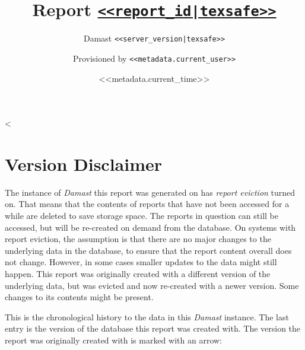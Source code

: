 \documentclass[fontsize=10pt,toc=chapterentrywithdots]{scrreprt}
\begin{document}
\title{Report \texttt{\href{<<report_url|texsafe>>}{<<report_id|texsafe>>}}}
\subtitle{Damast \texttt{<<server_version|texsafe>>}}
\date{<<metadata.current_time>>}
\author{Provisioned by \texttt{<<metadata.current_user>>}}
\publishers{Generated with Damast \\ \small{\url{https://github.com/UniStuttgart-VISUS/damast}}}

\maketitle

\pagestyle{scrheadings}
\cfoot*{}
\chead*{}
\ihead*{\textsc{\rightmark}}

\tableofcontents

<%
\clearpage
\chapter*{Version Disclaimer}
\label{chapter:version-disclaimer}

The instance of \emph{Damast} this report was generated on has \emph{report eviction} turned on.
That means that the contents of reports that have not been accessed for a while are deleted to save storage space.
The reports in question can still be accessed, but will be re-created on demand from the database.
On systems with report eviction, the assumption is that there are no major changes to the underlying data in the database, to ensure that the report content overall does not change.
However, in some cases smaller updates to the data might still happen.
This report was originally created with a different version of the underlying data, but was evicted and now re-created with a newer version.
Some changes to its contents might be present.

This is the chronological history to the data in this \emph{Damast} instance.
The last entry is the version of the database this report was created with.
The version the report was originally created with is marked with an arrow:
\end{document}
